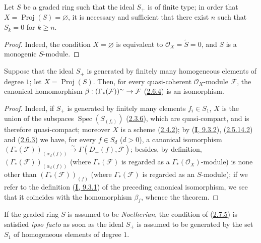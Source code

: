 \begin{corollary}[2.7.4]
\label{II.2.7.4}
Let $S$ be a graded ring such that the ideal $S_+$ is of finite type; in order
that $X=\operatorname{Proj}(S)=\varnothing$, it is necessary and sufficient
that there exist $n$ such that $S_k=0$ for $k\geq n$.
\end{corollary}

\begin{proof}
Indeed, the condition $X=\varnothing$ is equivalent to
$\mathcal{O}_X=\widetilde{S}=0$, and $S$ is a monogenic $S$-module.
\end{proof}

\begin{theorem}[2.7.5]
\label{II.2.7.5}
Suppose that the ideal $S_+$ is generated by finitely many homogeneous
elements of degree $1$; let $X=\operatorname{Proj}(S)$. Then, for every
quasi-coherent $\mathcal{O}_X$-module $\mathcal{F}$, the canonical
homomorphism $\beta:(\Gamma_*(\mathcal{F}))^{\sim}
\to\mathcal{F}$ \textup{(\hyperref[II.2.6.4]{2.6.4})} is an isomorphism.
\end{theorem}

\begin{proof}
Indeed, if $S_+$ is generated by finitely many elements $f_i\in S_1$, $X$ is
the union of the subspaces $\operatorname{Spec}(S_{(f_i)})$
(\hyperref[II.2.3.6]{2.3.6}), which are quasi-compact, and is therefore
quasi-compact; moreover $X$ is a scheme
(\hyperref[II.2.4.2]{2.4.2}); by
(\hyperref[I.9.3.2]{\textbf{I}, 9.3.2}),
(\hyperref[II.2.5.14.2]{2.5.14.2}) and
(\hyperref[II.2.6.3]{2.6.3}) we have, for every $f\in S_d$ ($d>0$), a
canonical isomorphism
$(\Gamma_*(\mathcal{F}))_{(\alpha_d(f))}\xrightarrow{\sim}
\Gamma(D_+(f),\mathcal{F})$; besides, by definition,
$(\Gamma_*(\mathcal{F}))_{(\alpha_d(f))}$ (where $\Gamma_*(\mathcal{F})$ is
regarded as a $\Gamma_*(\mathcal{O}_X)$-module) is none other than
$(\Gamma_*(\mathcal{F}))_{(f)}$ (where $\Gamma_*(\mathcal{F})$ is regarded
as an $S$-module); if we refer to the definition
(\hyperref[I.9.3.1]{\textbf{I}, 9.3.1}) of the preceding canonical isomorphism, we
see that it coincides with the homomorphism $\beta_f$, whence the theorem.
\end{proof}

\begin{remark}[2.7.6]
\label{II.2.7.6}
If the graded ring $S$ is assumed to be \emph{Noetherian}, the condition of
(\hyperref[II.2.7.5]{2.7.5}) is satisfied \emph{ipso facto} as soon as the
ideal $S_+$ is assumed to be generated by the set $S_1$ of homogeneous elements
of degree $1$.
\end{remark}

